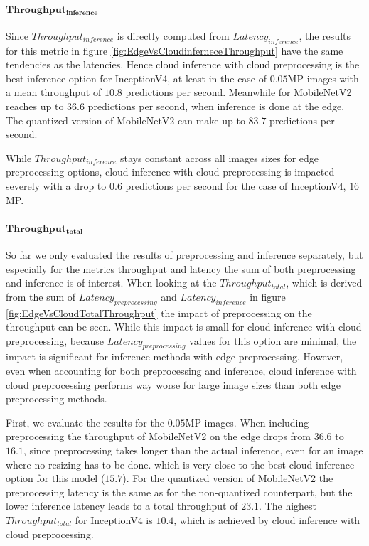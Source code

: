 \paragraph{$\mathbf{Throughput_{inference}}$}
Since $Throughput_{inference}$ is directly computed from $Latency_{inference}$, the results for this metric in figure \ref{fig:EdgeVsCloudinferneceThroughput} have the same tendencies as the latencies.
Hence cloud inference with cloud preprocessing is the best inference option for InceptionV4, at least in the case of $0.05$MP images with a mean throughput of $10.8$ predictions per second.
Meanwhile for MobileNetV2 reaches up to $36.6$ predictions per second, when inference is done at the edge.
The quantized version of MobileNetV2 can make up to $83.7$ predictions per second.

While $Throughput_{inference}$ stays constant across all images sizes for edge preprocessing options, cloud inference with cloud preprocessing is impacted severely with a drop to $0.6$ predictions per second for the case of InceptionV4, $16$MP.


\paragraph{$\mathbf{Throughput_{total}}$}
So far we only evaluated the results of preprocessing and inference separately, but especially for the metrics throughput and latency the sum of both preprocessing and inference is of interest.%
When looking at the $Throughput_{total}$, which is derived from the sum of $Latency_{preprocessing}$ and $Latency_{inference}$ in figure \ref{fig:EdgeVsCloudTotalThroughput} the impact of preprocessing on the throughput can be seen.
While this impact is small for cloud inference with cloud preprocessing, because $Latency_{preprocessing}$ values for this option are minimal, the impact is significant for inference methods with edge preprocessing.
However, even when accounting for both preprocessing and inference, cloud inference with cloud preprocessing performs way worse for large image sizes than both edge preprocessing methods.

First, we evaluate the results for the $0.05$MP images.
When including preprocessing the throughput of MobileNetV2 on the edge drops from $36.6$ to $16.1$, since preprocessing takes longer than the actual inference, even for an image where no resizing has to be done.
which is very close to the best cloud inference option for this model ($15.7$).
For the quantized version of MobileNetV2 the preprocessing latency is the same as for the non-quantized counterpart, but the lower inference latency leads to a total throughput of $23.1$.
The highest $Throughput_{total}$ for InceptionV4 is $10.4$, which is achieved by cloud inference with cloud preprocessing.


